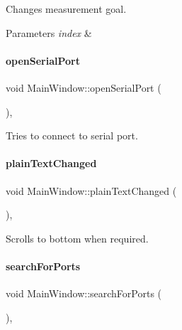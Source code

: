 Changes measurement goal. 


\begin{DoxyParams}{Parameters}
{\em index} & \\
\hline
\end{DoxyParams}
\mbox{\label{classMainWindow_a22d5b63d63ca5fc1fb9a7ef40efc38c8}} 
\paragraph{\texorpdfstring{open\+Serial\+Port}{openSerialPort}}
{\footnotesize\ttfamily void Main\+Window\+::open\+Serial\+Port (\begin{DoxyParamCaption}{ }\end{DoxyParamCaption})\hspace{0.3cm}{\ttfamily [private]}, {\ttfamily [slot]}}



Tries to connect to serial port. 

\mbox{\label{classMainWindow_a89b2e9afba74a68fd3b4a28d4475cec7}} 
\paragraph{\texorpdfstring{plain\+Text\+Changed}{plainTextChanged}}
{\footnotesize\ttfamily void Main\+Window\+::plain\+Text\+Changed (\begin{DoxyParamCaption}{ }\end{DoxyParamCaption})\hspace{0.3cm}{\ttfamily [private]}, {\ttfamily [slot]}}



Scrolls to bottom when required. 

\mbox{\label{classMainWindow_a5afc1f8c3bbce5e91e4cebf2dd4e6069}} 
\paragraph{\texorpdfstring{search\+For\+Ports}{searchForPorts}}
{\footnotesize\ttfamily void Main\+Window\+::search\+For\+Ports (\begin{DoxyParamCaption}{ }\end{DoxyParamCaption})\hspace{0.3cm}{\ttfamily [private]}, {\ttfamily [slot]}}



